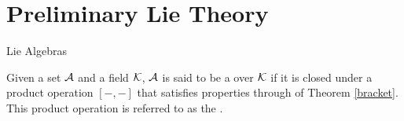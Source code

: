 \chapter{Preliminary Lie Theory}

\begin{section}{Lie Algebras}

\begin{definition}
\label{liealg}
Given a set $\mathcal{A}$ and a field $\mathcal{K}$, $\mathcal{A}$ is said to be a  over $\mathcal{K}$ if it is closed under a product operation $[-,-]$ that satisfies properties  through  of Theorem \ref{bracket}.  This product operation is referred to as the .
\end{definition}

\end{section}
